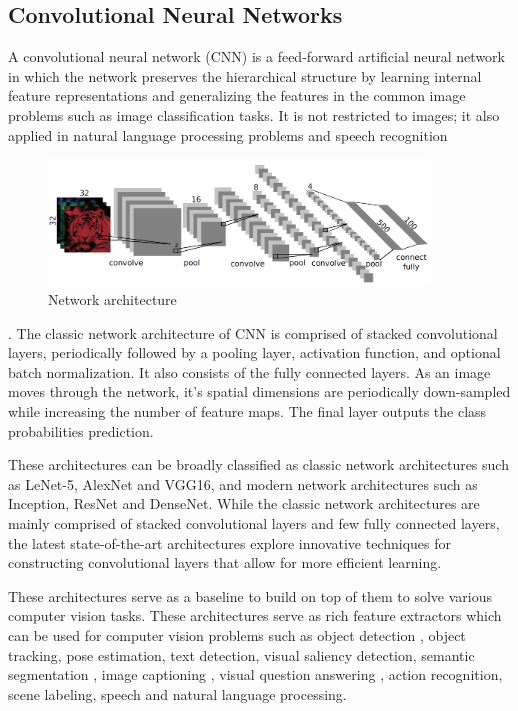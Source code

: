 \clearpage

\subsection{Convolutional Neural Networks}
A convolutional neural network (CNN) is a feed-forward artificial neural network in which the network preserves the hierarchical structure by learning internal feature representations and generalizing the features in the common image problems such as image classification tasks. It is not restricted to images; it also applied in natural language processing problems and speech recognition \cite{Manaswi2018} 

\begin{figure}[htbp]
\centering
\includegraphics[width=0.90\textwidth]{images/cnn-arch-1.png}
\caption{Network architecture \protect\footnotemark}
\label{fig:CNN-1}
\end{figure}
.
The classic network architecture of CNN is comprised of stacked convolutional layers, periodically followed by a pooling layer, activation function, and optional batch normalization. It also consists of the fully connected layers. As an image moves through the network, it's spatial dimensions are periodically down-sampled while increasing the number of feature maps. The final layer outputs the class probabilities prediction.

These architectures can be broadly classified as classic network architectures such as LeNet-5, AlexNet and VGG16, and modern network architectures such as Inception, ResNet and DenseNet. While the classic network architectures are mainly comprised of stacked convolutional layers and few fully connected layers, the latest state-of-the-art architectures explore innovative techniques for constructing convolutional layers that allow for more efficient learning.

These architectures serve as a baseline to build on top of them to solve various computer vision tasks. These architectures serve as rich feature extractors which can be used for computer vision problems such as object detection \cite{edseee.690947520140101}, object tracking, pose estimation, text detection, visual saliency detection, semantic segmentation \cite{edseee.690947520140101}, image captioning \cite{edsarx.1411.455520140101} \cite{edsarx.1411.495220140101} \cite{edseee.778086320160101}, visual question answering \cite{edseee.741063620150101} \cite{edsarx.1505.0561220150101} \cite{Wongsuphasawat2018}, action recognition, scene labeling, speech and natural language processing. 

